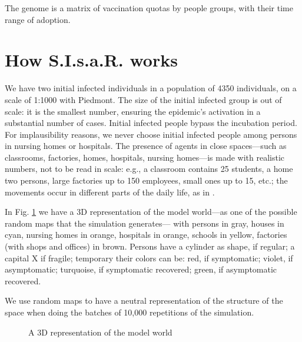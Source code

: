 \documentclass[graybox]{svmult}
\begin{document}
The genome is a matrix of vaccination quotas by people groups, with their time range of adoption. 


\section{How S.I.s.a.R. works}
\label{howWorks}

We have two initial infected individuals in a population of 4350 individuals, on a scale of 1:1000 with Piedmont. The size of the initial infected group is out of scale: it is the smallest number, ensuring the epidemic's activation in a substantial number of cases. Initial infected people bypass the incubation period. For implausibility reasons, we never choose initial infected people among persons in nursing homes or hospitals. The presence of agents in close spaces---such as classrooms, factories, homes, hospitals, nursing homes---is made with realistic numbers, not to be read in scale: e.g., a classroom contains 25 students, a home two persons, large factories up to 150 employees, small ones up to 15, etc.; the movements occur in different parts of the daily life, as in \cite{ghorbani2020assocc}.

In Fig. \ref{3D} we have a 3D representation of the model world---as one of the possible random maps that the simulation generates--- with persons in gray, houses in cyan, nursing homes in orange, hospitals in orange, schools in yellow, factories (with shops and offices) in brown. Persons have a cylinder as shape, if regular; a capital X if fragile; temporary their colors can be: red, if symptomatic; violet, if asymptomatic; turquoise, if symptomatic recovered; green, if asymptomatic recovered.

We use random maps to have a neutral representation of the structure of the space when doing the batches of 10,000 repetitions of the simulation. 

\begin{figure}[t]
\center
{}
\caption{A 3D representation of the model world}
\label{3D}
\end{figure}
\end{document}
